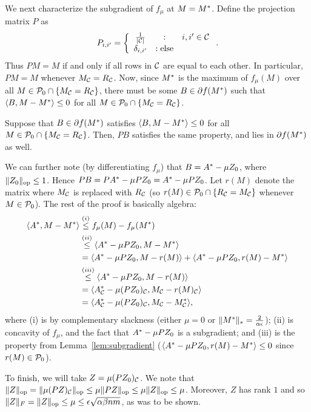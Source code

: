 We next characterize the subgradient of $f_{\mu}$ at $M = M^*$.
Define the projection matrix $P$ as
\[ P_{i,i'} = \left\{ \begin{array}{ccl} \frac{1}{|\mathcal{C}|} & : & i, i' \in \mathcal{C} \\ \delta_{i,i'} & : \text{else} \end{array} \right.. \]
Thus $PM = M$ if and only if all rows in $\mathcal{C}$ are equal to each other.
In particular, $PM = M$ whenever $M_{\mathcal{C}} = R_{\mathcal{C}}$. Now, since $M^*$ is the maximum 
of $f_{\mu}(M)$ over all $M \in \mathcal{P}_0 \cap \{M_{\mathcal{C}} = R_{\mathcal{C}}\}$, there must be some 
$B \in \partial f(M^*)$ such that $\langle B, M - M^* \rangle \leq 0$ for all $M \in \mathcal{P}_0 \cap \{M_{\mathcal{C}} = R_{\mathcal{C}}\}$.
\begin{lemma}
\label{lem:subgradient}
Suppose that $B \in \partial f(M^*)$ satisfies $\langle B, M - M^* \rangle \leq 0$ for all $M \in \mathcal{P}_0 \cap \{M_{\mathcal{C}} = R_{\mathcal{C}}\}$. 
Then, $PB$ satisfies the same property, and lies in $\partial f(M^*)$ as well.
\end{lemma}
We can further note (by differentiating $f_{\mu}$) that 
$B = A^* - \mu Z_0$, where $\|Z_0\|_{\mathrm{op}} \leq 1$. Hence 
$PB = PA^* - \mu PZ_0 = A^* - \mu PZ_0$. Let $r(M)$ denote the 
matrix where $M_{\mathcal{C}}$ is replaced with $R_{\mathcal{C}}$ (so $r(M) \in \mathcal{P}_0 \cap \{R_{\mathcal{C}} = M_{\mathcal{C}}\}$ 
whenever $M \in \mathcal{P}_0$). The rest of the proof is basically algebra:
\begin{align}
\langle A^*, M - M^* \rangle &\stackrel{(i)}{\leq} f_{\mu}(M) - f_{\mu}(M^*) \\
 &\stackrel{(ii)}{\leq} \langle A^* - \mu PZ_0, M - M^* \rangle \\
 &= \langle A^* - \mu PZ_0, M - r(M) \rangle + \langle A^* - \mu PZ_0, r(M) - M^* \rangle \\
 &\stackrel{(iii)}{\leq} \langle A^* - \mu PZ_0, M - r(M) \rangle \\
 &= \langle A^*_{\mathcal{C}} - \mu (PZ_0)_{\mathcal{C}}, M_{\mathcal{C}} - r(M)_{\mathcal{C}} \rangle \\
 &= \langle A^*_{\mathcal{C}} - \mu (PZ_0)_{\mathcal{C}}, M_{\mathcal{C}} - M^*_{\mathcal{C}} \rangle,
\end{align}
where (i) is by complementary slackness (either $\mu = 0$ or $\|M^*\|_* = \frac{2}{\alpha\epsilon}$); 
(ii) is concavity of $f_{\mu}$, and the fact that $A^* - \mu PZ_0$ is a subgradient; and 
(iii) is the property from Lemma~\ref{lem:subgradient} ($\langle A^* - \mu PZ_0, r(M) - M^* \rangle \leq 0$ since 
$r(M) \in \mathcal{P}_0$).

To finish, we will take $Z = \mu (PZ_0)_{\mathcal{C}}$. We note that
$\|Z\|_{\mathrm{op}} = \|\mu (PZ)_{\mathcal{C}}\|_{\mathrm{op}} \leq \mu \|PZ\|_{\mathrm{op}} \leq \mu \|Z\|_{\mathrm{op}} \leq \mu$.
Moreover, $Z$ has rank $1$ and so $\|Z\|_F = \|Z\|_{\mathrm{op}} \leq \mu \leq \epsilon\sqrt{\alpha\beta nm}$, as was to be shown.

